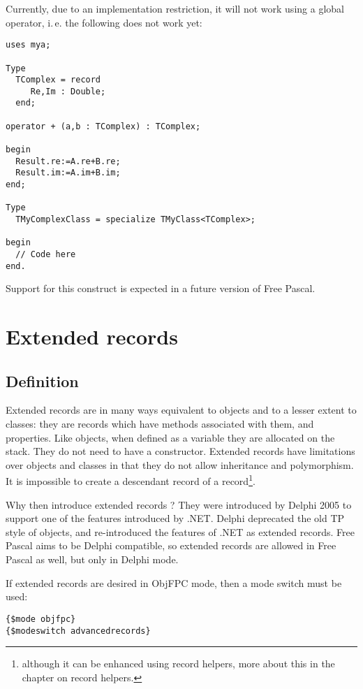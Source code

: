 Currently, due to an implementation restriction, it will not work using a global operator, i.\,e. the following does not work yet:
\begin{verbatim}
uses mya;

Type
  TComplex = record
     Re,Im : Double;
  end;

operator + (a,b : TComplex) : TComplex;

begin
  Result.re:=A.re+B.re;
  Result.im:=A.im+B.im;
end;

Type
  TMyComplexClass = specialize TMyClass<TComplex>;

begin
  // Code here
end.
\end{verbatim}
Support for this construct is expected in a future version of Free Pascal.


\chapter{Extended records}
\label{ch:ExtendedRecords}

\section{Definition}
Extended records are in many ways equivalent to objects and to a lesser
extent to classes: they are records which have methods associated with
them, and properties. Like objects, when defined as a variable they are
allocated on the stack. They do not need to have a constructor.
Extended records have limitations over objects and classes in that they
do not allow inheritance and polymorphism. It is impossible to create a
descendant record of a record\footnote{although it can be enhanced using record
helpers, more about this in the chapter on record helpers.}.

Why then introduce extended records ? They were introduced by Delphi
2005 to support one of the features introduced by .NET. Delphi deprecated
the old TP style of objects, and re-introduced the features of .NET as
extended records. Free Pascal aims to be Delphi
compatible, so extended records are allowed in Free Pascal as well,
but only in Delphi mode.

If extended records are desired in ObjFPC mode, then a mode switch must be
used:
\begin{verbatim}
{$mode objfpc}
{$modeswitch advancedrecords}
\end{verbatim}

